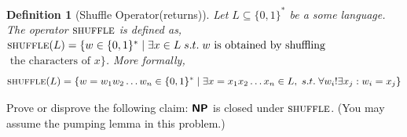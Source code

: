 \documentclass[addpoints]{exam}
\newcommand{\classX}[1]{\ensuremath{\text{\textsf{\textbf{#1}}}}}
\newcommand{\classP}{\classX{P}}
\newcommand{\classNP}{\classX{NP}}
\newcommand{\shuffle}{\textsc{shuffle}}
\newtheorem{definition}{Definition}
\begin{document}
\begin{questions}

    \newpage
    \question[10] 
    \begin{definition}[Shuffle Operator(returns)]
        Let $L \subseteq \{0,1\}^*$ be a some language. The operator $\shuffle$ is defined as, $\shuffle(L) = \{w\in \{0,1\}^*\mid \exists x \in L \;s.t. \; w \text{ is obtained by shuffling}$ \\$\text{ the characters of } x\}$. More formally, $$\shuffle(L) = \{w = w_1w_2\dots w_n\in \{0,1\}^*\mid \exists x = x_1x_2 \dots x_n \in L, \;s.t.\; \forall w_i !\exists x_j : w_i = x_j\}$$ 
    \end{definition}
    
    Prove or disprove the following claim: 
    $\classNP$ is closed under $\shuffle$.
    (You may assume the pumping lemma in this problem.)

    \begin{solution}
    \end{solution}


    \end{questions}
\end{document}
